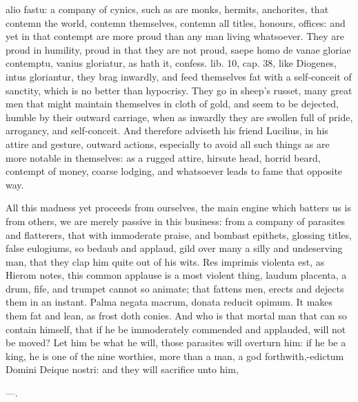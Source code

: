 {{alio fastu: a company of cynics, such as are monks, hermits,
anchorites, that contemn the world, contemn themselves, contemn all
titles, honours, offices: and yet in that contempt are more proud than
any man living whatsoever. They are proud in humility, proud in that
they are not proud, saepe homo de vanae gloriae contemptu, vanius
gloriatur, as \Austin{} hath it, confess. lib. 10, cap. 38, like Diogenes,
intus gloriantur, they brag inwardly, and feed themselves fat with a
self-conceit of sanctity, which is no better than hypocrisy. They go in
sheep's russet, many great men that might maintain themselves in cloth
of gold, and seem to be dejected, humble by their outward carriage,
when as inwardly they are swollen full of pride, arrogancy, and
self-conceit. And therefore \Seneca adviseth his friend Lucilius,
in his attire and gesture, outward actions, especially to avoid
all such things as are more notable in themselves: as a rugged attire,
hirsute head, horrid beard, contempt of money, coarse lodging, and
whatsoever leads to fame that opposite way.

All this madness yet proceeds from ourselves, the main engine which
batters us is from others, we are merely passive in this business: from
a company of parasites and flatterers, that with immoderate praise, and
bombast epithets, glossing titles, false eulogiums, so bedaub and
applaud, gild over many a silly and undeserving man, that they clap him
quite out of his wits. Res imprimis violenta est, as Hierom notes, this
common applause is a most violent thing, laudum placenta, a drum, fife,
and trumpet cannot so animate; that fattens men, erects and dejects
them in an instant.  Palma negata macrum, donata reducit opimum.
It makes them fat and lean, as frost doth conies. And who is that
mortal man that can so contain himself, that if he be immoderately
commended and applauded, will not be moved? Let him be what he will,
those parasites will overturn him: if he be a king, he is one of the
nine worthies, more than a man, a god forthwith,-edictum Domini
Deique nostri: and they will sacrifice unto him,

---.

}}
